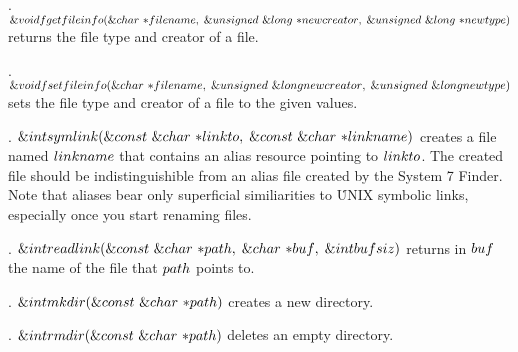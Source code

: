\fi

. \CD{}$\&{void}\ \\{fgetfileinfo}(\&{char}\ {*}\\{filename},\;\&{unsigned}%
\ \&{long}\ {*}\\{newcreator},\;\&{unsigned}\ \&{long}\ {*}\\{newtype})$\DC{}
returns the file type and creator of a file.

\fi

. \CD{}$\&{void}\ \\{fsetfileinfo}(\&{char}\ {*}\\{filename},\;\&{unsigned}%
\ \&{long}\ \\{newcreator},\;\&{unsigned}\ \&{long}\ \\{newtype})$\DC{}
sets the file type and creator of a file to the given values.

\fi

. \CD{}$\&{int}\ \\{symlink}(\&{const}\ \&{char}\ {*}\\{linkto},\;\&{const}%
\ \&{char}\ {*}\\{linkname})$\DC{} creates a file named \CD{}$\\{linkname}$%
\DC{} that
contains an alias resource pointing to \CD{}$\\{linkto}$\DC{}. The created file
should be
indistinguishible from an alias file created by the System 7 Finder. Note that
aliases bear only superficial similiarities to \.{UNIX} symbolic links,
especially
once you start renaming files.

\fi

. \CD{}$\&{int}\ \\{readlink}(\&{const}\ \&{char}\ {*}\\{path},\;\&{char}\
{*}\\{buf},\;\&{int}\ \\{bufsiz})$\DC{} returns in \CD{}$\\{buf}$\DC{} the name
of the
file that \CD{}$\\{path}$\DC{} points to.

\fi

. \CD{}$\&{int}\ \\{mkdir}(\&{const}\ \&{char}\ {*}\\{path})$\DC{} creates
a new directory.

\fi

. \CD{}$\&{int}\ \\{rmdir}(\&{const}\ \&{char}\ {*}\\{path})$\DC{} deletes
an empty directory.

